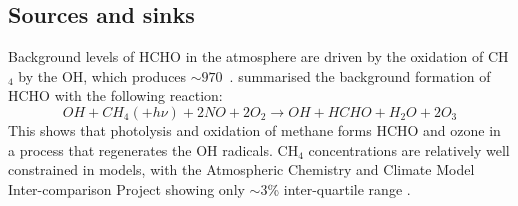   
  \subsection{Sources and sinks}
    \label{LR:HCHO:Sources}
     
    Background levels of HCHO in the atmosphere are driven by the oxidation of CH$_4$ by the OH$\dot{}$, which produces $\sim 970$\tgpyr ~\parencite{FortemsCheiney2012}.
    \textcite{Atkinson2000} summarised the background formation of HCHO with the following reaction:
    \begin{equation*} \label{LR:HCHO:Sources:eqn_MethaneBackground}
      OH + CH_4 (+ h\nu) + 2NO + 2O_2 \rightarrow OH + HCHO + H_2O + 2O_3
    \end{equation*}
    This shows that photolysis and oxidation of methane forms HCHO and ozone in a process that regenerates the OH radicals.
    CH$_4$ concentrations are relatively well constrained in models, with the Atmospheric Chemistry and Climate Model Inter-comparison Project showing only $\sim3$\% inter-quartile range \parencite{Young2013}.
    
